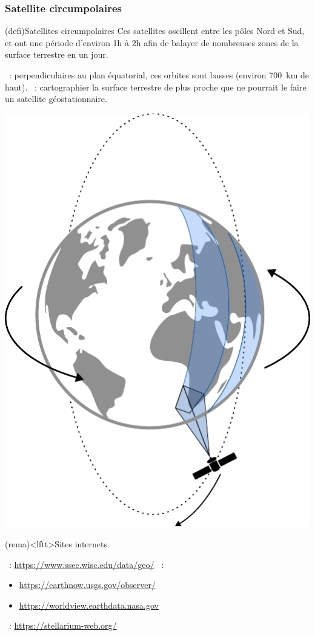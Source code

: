 \documentclass[../../main/main.tex]{subfiles}
\begin{document}
\subsubsection{Satellite circumpolaires}
\begin{tcb*}[sidebyside](defi){Satellites circumpolaires}
  Ces satellites oscillent entre les pôles Nord et Sud, et ont une période
  d'environ 1h à 2h afin de balayer de nombreuses zones de la surface terrestre
  en un jour.
  \begin{itemize}
    ~: perpendiculaires au plan équatorial, ces orbites sont
    basses (environ \SI{700}{km} de haut).
    ~: cartographier la surface terrestre de plus proche que ne
    pourrait le faire un satellite géostationnaire.
  \end{itemize}
  \tcblower
  \begin{center}
    \includegraphics[width=.5\linewidth]{sat_circum}
  \end{center}
\end{tcb*}

\begin{tcb*}(rema)<lftt>{Sites internets}
  \begin{itemize}
    ~: \url{https://www.ssec.wisc.edu/data/geo/}
    ~:
    \begin{itemize}
      \item \url{https://earthnow.usgs.gov/observer/}
      \item \url{https://worldview.earthdata.nasa.gov}
    \end{itemize}
    ~: \url{https://stellarium-web.org/}
  \end{itemize}
\end{tcb*}
\end{document}
